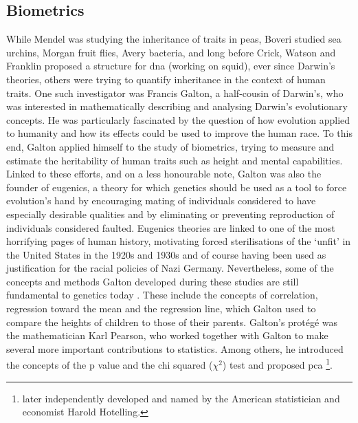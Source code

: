 \subsection{Biometrics} %
\label{sec:biometrics}

While Mendel was studying the inheritance of traits in peas, Boveri studied sea urchins, Morgan fruit flies, Avery bacteria, and long before Crick, Watson and Franklin proposed a structure for \gls{dna} (working on squid), ever since Darwin’s theories, others were trying to quantify inheritance in the context of human traits. 
One such investigator was Francis Galton, a half-cousin of Darwin’s, who was interested in mathematically describing and analysing Darwin’s evolutionary concepts. 
He was particularly fascinated by the question of how evolution applied to humanity and how its effects could be used to improve the human race. 
To this end, Galton applied himself to the study of biometrics, trying to measure and estimate the heritability of human traits such as height and mental capabilities. 
Linked to these efforts, and on a less honourable note, Galton was also the founder of eugenics, a theory for which genetics should be used as a tool to force evolution’s hand by encouraging mating of individuals considered to have especially desirable qualities and by eliminating or preventing reproduction of individuals considered faulted. Eugenics theories are linked to one of the most horrifying pages of human history, motivating forced sterilisations of the `unfit' in the United States in the 1920s and 1930s and of course having been used as justification for the racial policies of Nazi Germany.
Nevertheless, some of the concepts and methods Galton developed during these studies are still fundamental to genetics today \cite{galton1870hereditary}. 
These include the concepts of correlation, regression toward the mean and the regression line, which Galton used to compare the heights of children to those of their parents. 
Galton’s protégé was the mathematician Karl Pearson, who worked together with Galton to make several more important contributions to statistics. 
Among others, he introduced the concepts of the p value and the chi squared ($\chi^2$) test \cite{pearson1900x} and proposed \gls{pca} \cite{pearson1901liii}\footnote{later independently developed and named by the American statistician and economist Harold Hotelling.}.

